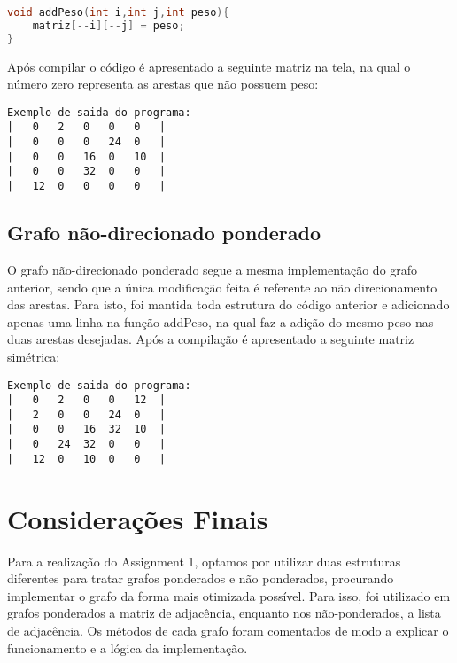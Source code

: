 \documentclass[12pt]{article}
\begin{document}
\begin{lstlisting}[language = C++]
void addPeso(int i,int j,int peso){
    matriz[--i][--j] = peso;     
}
\end{lstlisting}

Após compilar o código é apresentado a seguinte matriz na tela, na qual o número zero representa as arestas que não possuem peso:

\begin{lstlisting}[]
Exemplo de saida do programa:
|	0	2	0	0	0	|
|	0	0	0	24	0	|
|	0	0	16	0	10	|
|	0	0	32	0	0	|
|	12	0	0	0	0	|
\end{lstlisting}

\subsection{Grafo não-direcionado ponderado}
O grafo não-direcionado ponderado segue a mesma implementação do grafo anterior, sendo que a única modificação feita é referente ao não direcionamento das arestas. Para isto, foi mantida toda estrutura do código anterior e adicionado apenas uma linha na função addPeso, na qual faz a adição do mesmo peso nas duas arestas desejadas. Após a compilação é apresentado a seguinte matriz simétrica:

\begin{lstlisting}[]
Exemplo de saida do programa:
|	0	2	0	0	12	|
|	2	0	0	24	0	|
|	0	0	16	32	10	|
|	0	24	32	0	0	|
|	12	0	10	0	0	|
\end{lstlisting}

\section{Considerações Finais}
Para a realização do Assignment 1, optamos por utilizar duas estruturas diferentes para tratar grafos ponderados e não ponderados, procurando implementar o grafo da forma mais otimizada possível. Para isso, foi utilizado em grafos ponderados a matriz de adjacência, enquanto nos não-ponderados, a lista de adjacência. Os métodos de cada grafo foram comentados de modo a explicar o funcionamento e a lógica da implementação.
\end{document}
